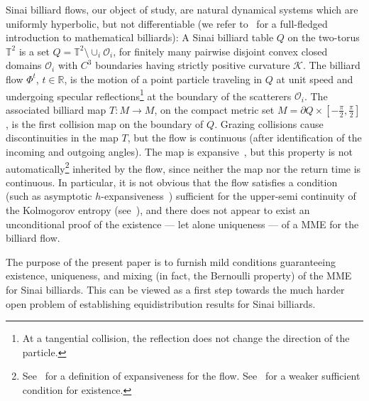 \documentclass[AHL,Unicode,longabstracts,published]{cedram}
\newcommand{\cK}{\mathcal{K}}
\newcommand{\OO}{\mathcal{O}}
\newcommand{\bbT}{\mathbb{T}}
\newcommand{\bbR}{\mathbb{R}}
\begin{document}
Sinai billiard flows, our object of study, are natural dynamical systems which are uniformly hyperbolic, but not differentiable (we refer to~\cite{CM} for a full-fledged introduction to mathematical billiards): A Sinai billiard table $Q$ on the two-torus $\bbT^2$ is a set $ Q=\bbT^2 \setminus \cup_{i} \OO_i $, for finitely many pairwise disjoint convex closed domains $\OO_i$ with $C^3$ boundaries having strictly positive curvature $\cK$. The billiard flow $\Phi^t$, $t \in \bbR$, is the motion of a point particle traveling in $Q$ at unit speed and undergoing specular reflections\footnote{At a tangential collision, the reflection does not change the direction of the particle.} at the boundary of the scatterers $\OO_i$. The associated billiard map $T:M\to M$, on the compact metric set $M = \partial Q \times [-\frac{\pi}{2}, \frac{\pi}{2}]$, is the first collision map on the boundary of $Q$. Grazing collisions cause discontinuities in the map $T$, but the flow is continuous (after identification of the incoming and outgoing angles). The map is expansive~\cite{BD1}, but this property is not automatically\footnote{See~\cite{BW} for a definition of expansiveness for the flow. See~\cite[Ex.~1.6]{Bo0} for a weaker sufficient condition for existence.} inherited by the flow, since neither the map nor the return time is continuous. In particular, it is not obvious that the flow satisfies a condition (such as asymptotic $h$-expansiveness~\cite{Mi}) sufficient for the upper-semi continuity of the Kolmogorov entropy (see~\cite[App. A--B]{Ca}), and there does not appear to exist an unconditional proof of the existence --- let alone uniqueness --- of a MME for the billiard flow.



The purpose of the present paper is to furnish mild conditions guaranteeing existence, uniqueness, and mixing (in fact, the Bernoulli property) of the MME for Sinai billiards. This can be viewed as a first step towards the much harder open problem of establishing equidistribution results for Sinai billiards.
\end{document}
